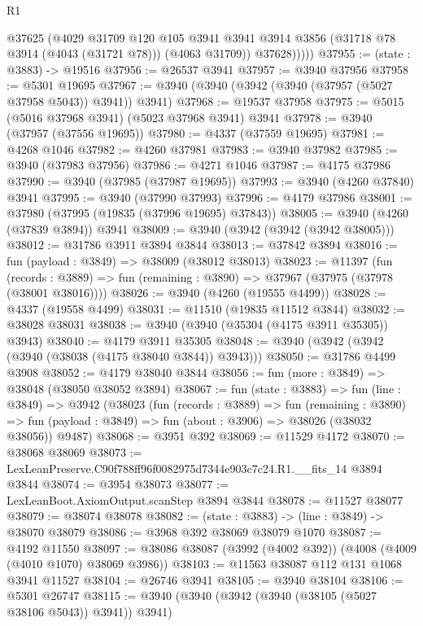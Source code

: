 \begin{lexlean}{R1}
\begin{coremodule}
              @37625
              (@4029
                @31709
                @120
                @105
                @3941
                @3941
                @3914
                @3856
                (@31718 @78 @3914 (@4043 (@31721 @78)))
                (@4063 @31709))
              @37628)))))
@37955 := (state : @3883) -> @19516
@37956 := @26537 @3941
@37957 := @3940 @37956
@37958 := @5301 @19695
@37967 := @3940 (@3940 (@3942 (@3940 (@37957 (@5027 @37958 @5043)) @3941)) @3941)
@37968 := @19537 @37958
@37975 := @5015 (@5016 @37968 @3941) (@5023 @37968 @3941) @3941
@37978 := @3940 (@37957 (@37556 @19695))
@37980 := @4337 (@37559 @19695)
@37981 := @4268 @1046
@37982 := @4260 @37981
@37983 := @3940 @37982
@37985 := @3940 (@37983 @37956)
@37986 := @4271 @1046
@37987 := @4175 @37986
@37990 := @3940 (@37985 (@37987 @19695))
@37993 := @3940 (@4260 @37840) @3941
@37995 := @3940 (@37990 @37993)
@37996 := @4179 @37986
@38001 := @37980 (@37995 (@19835 (@37996 @19695) @37843))
@38005 := @3940 (@4260 (@37839 @3894)) @3941
@38009 := @3940 (@3942 (@3942 (@3942 @38005)))
@38012 := @31786 @3911 @3894 @3844
@38013 := @37842 @3894
@38016 := fun (payload : @3849) => @38009 (@38012 @38013)
@38023 := @11397
    (fun (records : @3889) => fun (remaining : @3890) => @37967 (@37975 (@37978 (@38001 @38016))))
@38026 := @3940 (@4260 (@19555 @4499))
@38028 := @4337 (@19558 @4499)
@38031 := @11510 (@19835 @11512 @3844)
@38032 := @38028 @38031
@38038 := @3940 (@3940 (@35304 (@4175 @3911 @35305)) @3943)
@38040 := @4179 @3911 @35305
@38048 := @3940 (@3942 (@3942 (@3940 (@38038 (@4175 @38040 @3844)) @3943)))
@38050 := @31786 @4499 @3908
@38052 := @4179 @38040 @3844
@38056 := fun (more : @3849) => @38048 (@38050 @38052 @3894)
@38067 := fun (state : @3883) =>
  fun (line : @3849) =>
  @3942
    (@38023
      (fun (records : @3889) =>
      fun (remaining : @3890) =>
      fun (payload : @3849) => fun (about : @3906) => @38026 (@38032 @38056))
      @9487)
@38068 := @3951 @392
@38069 := @11529 @4172
@38070 := @38068 @38069
@38073 := LexLeanPreserve.C90f788ff96f0082975d7344e903c7c24.R1.__fits_14 @3894 @3844
@38074 := @3954 @38073
@38077 := LexLeanBoot.AxiomOutput.scanStep @3894 @3844
@38078 := @11527 @38077
@38079 := @38074 @38078
@38082 := (state : @3883) -> (line : @3849) -> @38070 @38079
@38086 := @3968 @392 @38069 @38079 @1070
@38087 := @4192 @11550
@38097 := @38086 @38087 (@3992 (@4002 @392)) (@4008 (@4009 (@4010 @1070) @38069 @3986))
@38103 := @11563 @38087 @112 @131 @1068 @3941 @11527
@38104 := @26746 @3941
@38105 := @3940 @38104
@38106 := @5301 @26747
@38115 := @3940 (@3940 (@3942 (@3940 (@38105 (@5027 @38106 @5043)) @3941)) @3941)

\end{coremodule}
\end{lexlean}
